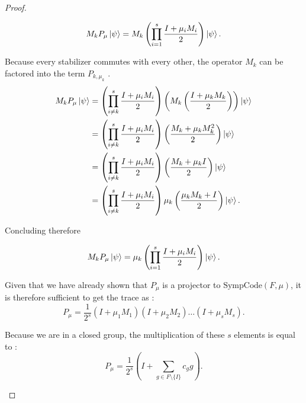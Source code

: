 \begin{theorem}
\begin{proof}
\begin{enumerate}
      \begin{equation}
        M_k P_\mu \ket{\psi} = M_k \left(\prod_{i = 1}^s \frac{I + \mu_i M_i}{2}\right)\ket{\psi}
      .\end{equation}

      Because every stabilizer commutes with every other, the operator $M_k$ can be factored into the term $P_{k, \mu_k}$ \citep{Kitaev2002}.
      \begin{align*}
        M_k P_\mu \ket{\psi} &= \left(\prod_{i \neq k}^s \frac{I + \mu_i M_i}{2}\right) \left(M_k\left(\frac{I + \mu_k M_k}{2}\right)\right) \ket{\psi}\\
        &= \left(\prod_{i \neq k}^s \frac{I + \mu_i M_i}{2}\right) \left(\frac{M_k + \mu_k M_k^2}{2}\right) \ket{\psi}\\
        &= \left(\prod_{i \neq k}^s \frac{I + \mu_i M_i}{2}\right) \left(\frac{M_k + \mu_k I}{2}\right) \ket{\psi}\\
        &= \left(\prod_{i \neq k}^s \frac{I + \mu_i M_i}{2}\right) \mu_k\left(\frac{\mu_k M_k + I}{2}\right) \ket{\psi}
      .\end{align*}

      Concluding therefore
      
      \begin{equation}
        M_k P_\mu \ket{\psi} = \mu_k \left(\prod_{i = 1}^s \frac{I + \mu_i M_i}{2}\right)\ket{\psi}
      .\end{equation}

      Given that we have already shown that $P_\mu$ is a projector to $\text{SympCode}(F, \mu)$, it is therefore sufficient to get the trace as \citep{Cesar2024}:
      \begin{equation}
        P_\mu = \frac{1}{2^s} (I + \mu_1M_1)(I + \mu_2M_2)\dots(I + \mu_s M_s)
      .\end{equation}

      Because we are in a closed group, the multiplication of these $s$ elements is equal to \citep{Cesar2024}:
      \begin{equation}
        P_\mu = \frac{1}{2^s}\left(I + \sum_{g \in F \setminus \{I\}} c_g g\right)
      .\end{equation}


\end{enumerate}
\end{proof}
\end{theorem}
